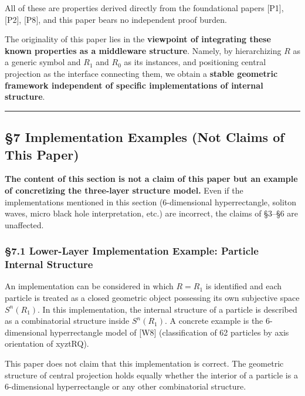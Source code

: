 \documentclass[
  a4paper,11pt]{article}
\begin{document}
All of these are properties derived directly from the foundational
papers {[}P1{]}, {[}P2{]}, {[}P8{]}, and this paper bears no independent
proof burden.

The originality of this paper lies in the \textbf{viewpoint of
integrating these known properties as a middleware structure}. Namely,
by hierarchizing \(R\) as a generic symbol and \(R_1\) and \(R_0\) as
its instances, and positioning central projection as the interface
connecting them, we obtain a \textbf{stable geometric framework
independent of specific implementations of internal structure}.

\begin{center}\rule{0.5\linewidth}{0.5pt}\end{center}

\subsection{§7 Implementation Examples (Not Claims of This
Paper)}\label{implementation-examples-not-claims-of-this-paper}

\textbf{The content of this section is not a claim of this paper but an
example of concretizing the three-layer structure model.} Even if the
implementations mentioned in this section (6-dimensional hyperrectangle,
soliton waves, micro black hole interpretation, etc.) are incorrect, the
claims of §3--§6 are unaffected.

\subsubsection{§7.1 Lower-Layer Implementation Example: Particle
Internal
Structure}\label{lower-layer-implementation-example-particle-internal-structure}

An implementation can be considered in which \(R = R_1\) is identified
and each particle is treated as a closed geometric object possessing its
own subjective space \(S^n(R_1)\). In this implementation, the internal
structure of a particle is described as a combinatorial structure inside
\(S^n(R_1)\). A concrete example is the 6-dimensional hyperrectangle
model of {[}W8{]} (classification of 62 particles by axis orientation of
xyztRQ).

This paper does not claim that this implementation is correct. The
geometric structure of central projection holds equally whether the
interior of a particle is a 6-dimensional hyperrectangle or any other
combinatorial structure.
\end{document}
